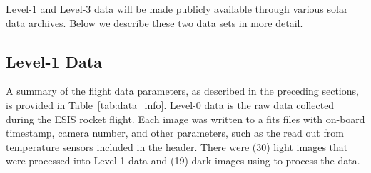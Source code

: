     Level-1 and Level-3 data will be made publicly available through various solar data archives. Below we describe these two data sets in more detail. 
    
    
       
    
	     

    
    \subsection{Level-1 Data}
	    
  
    
    	A summary of the flight data parameters, as described in the preceding sections, is provided in Table~\ref{tab:data_info}. Level-0 data is the raw data collected during the ESIS rocket flight.  
	    Each image was written to a fits files with on-board timestamp, camera number, and other parameters, such as the read out from temperature sensors included in the header.   There were (30) light images that were processed into Level 1 data and (19) dark images using to process the data.
	   

